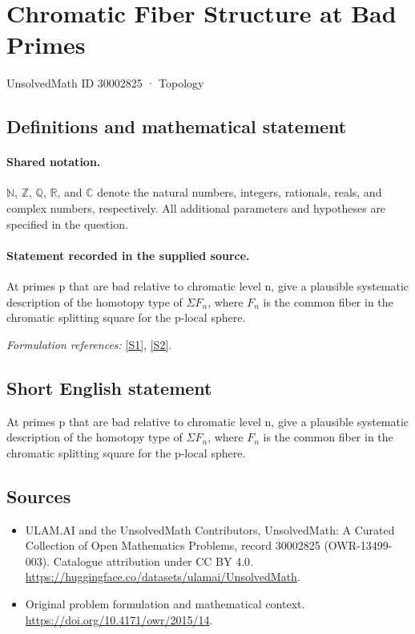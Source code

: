 \documentclass[11pt]{article}
\newcommand{\sref}[2]{\hyperlink{source:#1:#2}{[S#2]}}
\begin{document}
\setcounter{section}{30002824}
\section{Chromatic Fiber Structure at Bad Primes}\label{30002825}
{\small UnsolvedMath ID 30002825 · Topology}
\subsection{Definitions and mathematical statement}

\paragraph{Shared notation.}$\mathbb N$, $\mathbb Z$, $\mathbb Q$, $\mathbb R$, and $\mathbb C$ denote the natural numbers, integers, rationals, reals, and complex numbers, respectively. All additional parameters and hypotheses are specified in the question.


\paragraph{Statement recorded in the supplied source.}
At primes p that are bad relative to chromatic level n, give a plausible systematic description of the homotopy type of $\Sigma F_n$, where $F_n$ is the common fiber in the chromatic splitting square for the p-local sphere.
\par\smallskip\textit{Formulation references:} \sref{30002825}{1}, \sref{30002825}{2}.
\subsection{Short English statement}
At primes p that are bad relative to chromatic level n, give a plausible systematic description of the homotopy type of $\Sigma F_n$, where $F_n$ is the common fiber in the chromatic splitting square for the p-local sphere.
\subsection{Sources}
\begin{itemize}
\item[\hypertarget{source:30002825:1}{S1}] ULAM.AI and the UnsolvedMath Contributors, UnsolvedMath: A Curated Collection of Open Mathematics Problems, record 30002825 (OWR-13499-003). Catalogue attribution under CC BY 4.0.
\url{https://huggingface.co/datasets/ulamai/UnsolvedMath}.
\item[\hypertarget{source:30002825:2}{S2}] Original problem formulation and mathematical context.
\url{https://doi.org/10.4171/owr/2015/14}.
\end{itemize}
\label{end:30002825}
\end{document}
